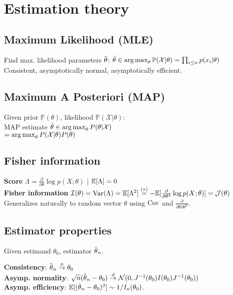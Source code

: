 \section*{Estimation theory}

\subsection*{Maximum Likelihood (MLE)}
Find  max. likelihood parameters $\hat{\kern0pt \theta}$:
$\hat{\theta}\in \operatorname*{arg\,max}_\theta \mathbb{P}(\mathcal{X}|\theta) =\prod_{i\leq n}p(x_i|\theta)$\\
Consistent, asymptotically normal, asymptotically efficient.

\subsection*{Maximum A Posteriori (MAP)}
Given prior $\mathbb{P}(\theta)$, likelihood $\mathbb{P}(\mathcal{X}|\theta)$:\\  MAP estimate $\hat{\theta}\in \operatorname*{arg\,max}_\theta P(\theta|\mathcal{X})$\\ $=\operatorname*{arg\,max}_\theta P(\mathcal{X}|\theta)P(\theta)$\\

\subsection*{Fisher information}
\textbf{Score} $\Lambda = \frac{\partial}{\partial\theta} \log p(X;\theta)$ | $\mathbb{E}[\Lambda] = 0$\\
\textbf{Fisher information} $\mathcal{I}(\theta) = \mathrm{Var}(\Lambda) = \mathbb{E}[\Lambda^2] \overset{(*)}{=}
-\mathbb{E}[\frac{\partial}{\partial\theta^2} \log p(X;\theta)] = \mathcal{J}(\theta)$
Generalizes naturally to random vector $\mathbb{\theta}$ using $\mathrm{Cov}$ and $\frac{\partial}{\partial\theta\partial\theta^T}$.

\subsection*{Estimator properties}

Given estimand $\theta_0$, estimator $\hat{\kern0pt \theta}_n$.

\textbf{Consistency}: $\hat{\kern0pt \theta}_n \overset{p}{\to} \theta_0$\\
\textbf{Asymp. normality}: $\sqrt{n}(\hat{\kern0pt \theta}_n-\theta_0) \overset{d}{\to} \mathcal{N}(0, J^{-1}(\theta_0)I(\theta_0)J^{-1}(\theta_0))$\\
\textbf{Asymp. efficiency}:
$\mathbb{E}[(\hat{\kern0pt \theta}_n - \theta_0)^2]\sim 1/I_n(\theta_0)$.

